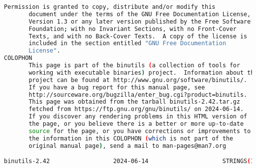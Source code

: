 {{\begin{lstlisting}[language=bash]
       Permission is granted to copy, distribute and/or modify this
       document under the terms of the GNU Free Documentation License,
       Version 1.3 or any later version published by the Free Software
       Foundation; with no Invariant Sections, with no Front-Cover
       Texts, and with no Back-Cover Texts.  A copy of the license is
       included in the section entitled "GNU Free Documentation
       License".
COLOPHON
       This page is part of the binutils (a collection of tools for
       working with executable binaries) project.  Information about the
       project can be found at http://www.gnu.org/software/binutils/.
       If you have a bug report for this manual page, see
       http://sourceware.org/bugzilla/enter_bug.cgi?product=binutils.
       This page was obtained from the tarball binutils-2.42.tar.gz
       fetched from https://ftp.gnu.org/gnu/binutils/ on 2024-06-14.
       If you discover any rendering problems in this HTML version of
       the page, or you believe there is a better or more up-to-date
       source for the page, or you have corrections or improvements to
       the information in this COLOPHON (which is not part of the
       original manual page), send a mail to man-pages@man7.org

binutils-2.42                  2024-06-14                     STRINGS(1)
\end{lstlisting}
}}
\endinput  %
